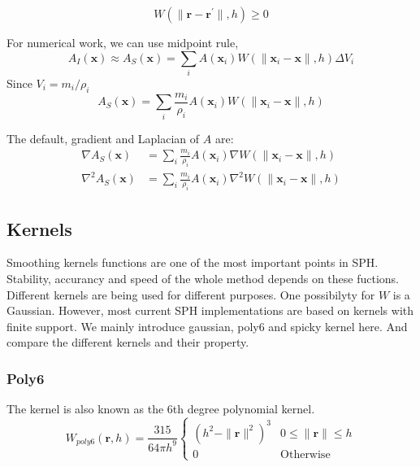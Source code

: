     \begin{equation}
        W(\|\textbf{r} - \textbf{r}^{\prime}\|, h) \ge 0
    \end{equation}

    For numerical work, we can use midpoint rule,
    \begin{equation}
        A_{I}(\textbf{x}) \approx A_{S}(\textbf{x}) = \sum_{i} A(\textbf{x}_{i})W(\|\textbf{x}_{i}-\textbf{x}\|, h)\Delta V_{i}
    \end{equation}
    Since $V_{i} = m_{i}/\rho _{i}$
    \begin{equation}
        A_{S}(\textbf{x}) = \sum_{i} \frac{m_{i}}{\rho_{i}} A(\textbf{x}_{i})W(\|\textbf{x}_{i}-\textbf{x}\|, h)
    \end{equation}

    The default, gradient and Laplacian of $A$ are:
    \begin{equation}
        \begin{aligned}
            \nabla A_{S}(\textbf{x}) &= \sum_{i} \frac{m_{i}}{\rho_{i}} A(\textbf{x}_{i})\nabla W(\|\textbf{x}_{i}-\textbf{x}\|, h) \\
            \nabla^{2} A_{S}(\textbf{x}) &= \sum_{i} \frac{m_{i}}{\rho_{i}} A(\textbf{x}_{i})\nabla^{2} W(\|\textbf{x}_{i}-\textbf{x}\|, h)
        \end{aligned}
        \label{eq:1}
    \end{equation}

    \subsection{Kernels}
    Smoothing kernels functions are one of the most important points in SPH. Stability, accurancy and speed of the whole method depends on these fuctions. Different kernels are being used for different purposes. One possibilyty for $W$ is a Gaussian. However, most current SPH implementations are based on kernels with finite support. We mainly introduce gaussian, poly6 and spicky kernel here. And compare the different kernels and their property.

    \subsubsection{Poly6}
    The kernel is also known as the 6th degree polynomial kernel.
    \begin{equation}
        W_{poly 6}(\textbf{r}, h) = \frac{315}{64\pi h^{9}}
            \begin{cases}
                (h^2 - \|\textbf{r}\|^2)^3 & 0 \le \|\textbf{r}\| \le h \\
                0 & \textrm{Otherwise}
            \end{cases}
    \end{equation}

